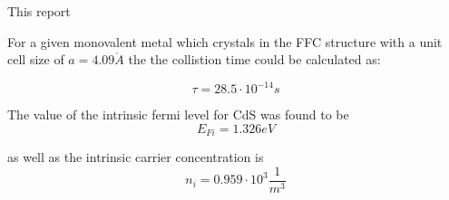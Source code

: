 


This report 


For a given monovalent metal which crystals in the FFC structure
with a unit cell size of  $a = 4.09 \mathring{A}$ the the collistion
time could be calculated as:

$$\tau = 28.5 \cdot 10^{-14}s$$


The value of the intrinsic fermi level for CdS was found to be
$$E_{Fi} = 1.326 eV$$

as well as the intrinsic carrier concentration is
$$n_i = 0.959 \cdot 10^3 \frac{1}{m^3}$$

